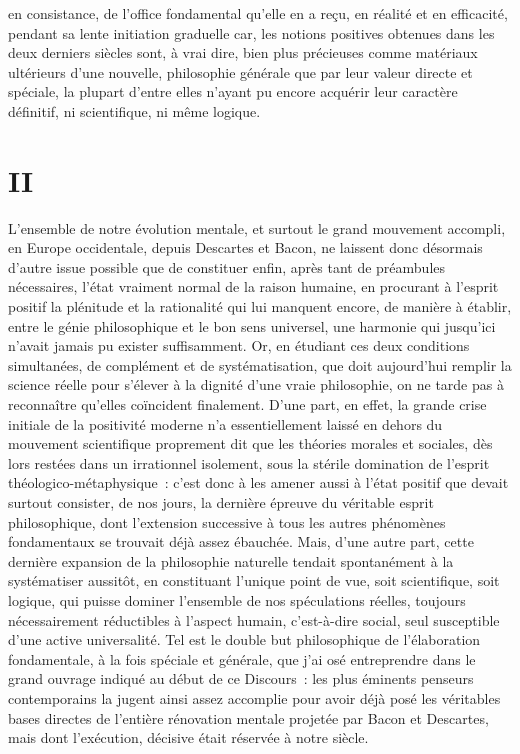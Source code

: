 \documentclass[french,twoside]{book} %
\begin{document}
en consistance, de l’office fondamental qu’elle en a reçu, en réalité et en efficacité, pendant sa lente initiation graduelle car, les notions positives obtenues dans les deux derniers siècles sont, à vrai dire, bien plus précieuses comme matériaux ultérieurs d’une nouvelle, philosophie générale que par leur valeur directe et spéciale, la plupart d’entre elles n’ayant pu encore acquérir leur caractère définitif, ni scientifique, ni même logique.
\section[{II}]{II}
\label{II}\renewcommand{\leftmark}{II}

\noindent L’ensemble de notre évolution mentale, et surtout le grand mouvement accompli, en Europe occidentale, depuis Descartes et Bacon, ne laissent donc désormais d’autre issue possible que de constituer enfin, après tant de préambules nécessaires, l’état vraiment normal de la raison humaine, en procurant à l’esprit positif la plénitude et la rationalité qui lui manquent encore, de manière à établir, entre le génie philosophique et le bon sens universel, une harmonie qui jusqu’ici n’avait jamais pu exister suffisamment. Or, en étudiant ces deux conditions simultanées, de complément et de systématisation, que doit aujourd’hui remplir la science réelle pour s’élever à la dignité d’une vraie philosophie, on ne tarde pas à reconnaître qu’elles coïncident finalement. D’une part, en effet, la grande crise initiale de la positivité moderne n’a essentiellement laissé en dehors du mouvement scientifique proprement dit que les théories morales et sociales, dès lors restées dans un irrationnel isolement, sous la stérile domination de l’esprit théologico-métaphysique : c’est donc à les amener aussi à l’état positif que devait surtout consister, de nos jours, la dernière épreuve du véritable esprit philosophique, dont l’extension successive à tous les autres phénomènes fondamentaux se trouvait déjà assez ébauchée. Mais, d’une autre part, cette dernière expansion de la philosophie naturelle tendait spontanément à la systématiser aussitôt, en constituant l’unique point de vue, soit scientifique, soit logique, qui puisse dominer l’ensemble de nos spéculations réelles, toujours nécessairement réductibles à l’aspect humain, c’est-à-dire social, seul susceptible d’une active universalité. Tel est le double but philosophique de l’élaboration fondamentale, à la fois spéciale et générale, que j’ai osé entreprendre dans le grand ouvrage indiqué au début de ce Discours : les plus éminents penseurs contemporains la jugent ainsi assez accomplie pour avoir déjà posé les véritables bases directes de l’entière rénovation mentale projetée par Bacon et Descartes, mais dont l’exécution, décisive était réservée à notre siècle.\par
\end{document}
